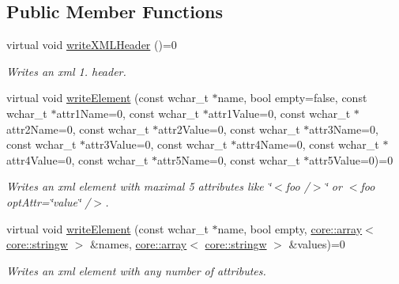 \subsection*{Public Member Functions}
\begin{DoxyCompactItemize}
\item 
virtual void \hyperlink{classirr_1_1io_1_1IXMLWriter_a66fd00f6528fc967e53ea2a83f4fbf09}{write\+X\+M\+L\+Header} ()=0
\begin{DoxyCompactList}\small\item\em Writes an xml 1. header. \end{DoxyCompactList}\item 
virtual void \hyperlink{classirr_1_1io_1_1IXMLWriter_a09ffde58db20f23b7eba1bf08e1daf42}{write\+Element} (const wchar\+\_\+t $\ast$name, bool empty=false, const wchar\+\_\+t $\ast$attr1\+Name=0, const wchar\+\_\+t $\ast$attr1\+Value=0, const wchar\+\_\+t $\ast$attr2\+Name=0, const wchar\+\_\+t $\ast$attr2\+Value=0, const wchar\+\_\+t $\ast$attr3\+Name=0, const wchar\+\_\+t $\ast$attr3\+Value=0, const wchar\+\_\+t $\ast$attr4\+Name=0, const wchar\+\_\+t $\ast$attr4\+Value=0, const wchar\+\_\+t $\ast$attr5\+Name=0, const wchar\+\_\+t $\ast$attr5\+Value=0)=0
\begin{DoxyCompactList}\small\item\em Writes an xml element with maximal 5 attributes like \char`\"{}$<$foo /$>$\char`\"{} or $<$foo opt\+Attr=\char`\"{}value\char`\"{} /$>$. \end{DoxyCompactList}\item 
\mbox{\label{classirr_1_1io_1_1IXMLWriter_a78bbf9835512bb404c34339c1a34ea31}} 
virtual void \hyperlink{classirr_1_1io_1_1IXMLWriter_a78bbf9835512bb404c34339c1a34ea31}{write\+Element} (const wchar\+\_\+t $\ast$name, bool empty, \hyperlink{classirr_1_1core_1_1array}{core\+::array}$<$ \hyperlink{namespaceirr_1_1core_a5aedb62cb47cf01d1c548ab5e6344d2d}{core\+::stringw} $>$ \&names, \hyperlink{classirr_1_1core_1_1array}{core\+::array}$<$ \hyperlink{namespaceirr_1_1core_a5aedb62cb47cf01d1c548ab5e6344d2d}{core\+::stringw} $>$ \&values)=0
\begin{DoxyCompactList}\small\item\em Writes an xml element with any number of attributes. \end{DoxyCompactList}\item 
\mbox{\label{classirr_1_1io_1_1IXMLWriter_af6de322540d69764bd33a384763babd1}} 

\end{DoxyCompactItemize}
